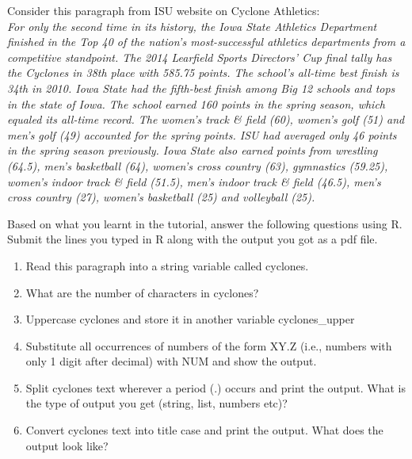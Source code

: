 \documentclass[11pt,a4paper]{article}
\begin{document}
Consider this paragraph from ISU website on Cyclone Athletics: \\
\textit{For only the second time in its history, the Iowa State Athletics Department finished in the Top 40 of the nation's most-successful athletics departments from a competitive standpoint. The 2014 Learfield Sports Directors' Cup final tally has the Cyclones in 38th place with 585.75 points. The school's all-time best finish is 34th in 2010. Iowa State had the fifth-best finish among Big 12 schools and tops in the state of Iowa. The school earned 160 points in the spring season, which equaled its all-time record. The women’s track \& field (60), women’s golf (51) and men’s golf (49) accounted for the spring points. ISU had averaged only 46 points in the spring season previously. Iowa State also earned points from wrestling (64.5), men's basketball (64), women's cross country (63), gymnastics (59.25), women's indoor track \& field (51.5), men's indoor track \& field (46.5), men's cross country (27), women's basketball (25) and volleyball (25).}

Based on what you learnt in the tutorial, answer the following questions using R. Submit the lines you typed in R along with the output you got as a pdf file. 
\begin{enumerate}
\item Read this paragraph into a string variable called cyclones.
\item What are the number of characters in cyclones?
\item Uppercase cyclones and store it in another variable cyclones\_upper
\item Substitute all occurrences of numbers of the form XY.Z (i.e., numbers with only 1 digit after decimal) with NUM and show the output.
\item Split cyclones text wherever a period (.) occurs and print the output. What is the type of output you get (string, list, numbers etc)? 
\item Convert cyclones text into title case and print the output. What does the output look like? 
\end{enumerate}
\end{document}
